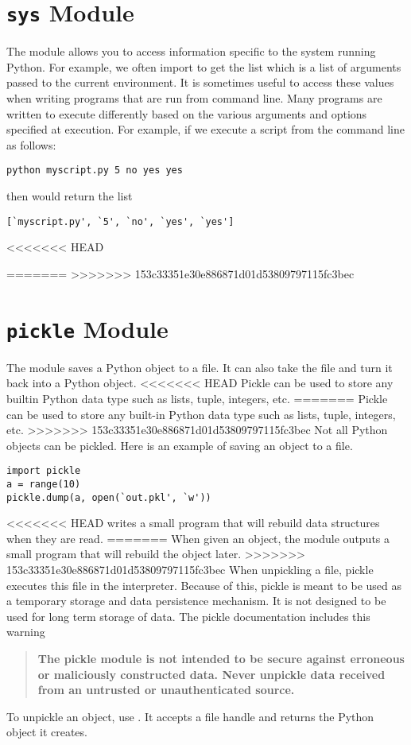 \section*{\texttt{sys} Module}
The  module allows you to access information specific to the system running Python.
For example, we often import  to get the list  which is a list of arguments passed to the current environment.
It is sometimes useful to access these values when writing programs that are run from command line.
Many programs are written to execute differently based on the various arguments and options specified at execution.
For example, if we execute a script from the command line as follows:
\begin{verbatim}
python myscript.py 5 no yes yes
\end{verbatim}
then  would return the list
\begin{verbatim}
[`myscript.py', `5', `no', `yes', `yes']
\end{verbatim}
<<<<<<< HEAD

=======
>>>>>>> 153c33351e30e886871d01d53809797115fc3bec

\section*{\texttt{pickle} Module}
The  module saves a Python object to a file.
It can also take the file and turn it back into a Python object.
<<<<<<< HEAD
Pickle can be used to store any builtin Python data type such as lists, tuple, integers, etc.
=======
Pickle can be used to store any built-in Python data type such as lists, tuple, integers, etc.
>>>>>>> 153c33351e30e886871d01d53809797115fc3bec
Not all Python objects can be pickled.
Here is an example of saving an object to a file.
\begin{lstlisting}
import pickle
a = range(10)
pickle.dump(a, open(`out.pkl', `w'))
\end{lstlisting}
<<<<<<< HEAD
 writes a small program that will rebuild data structures when they are read.
=======
When given an object, the  module outputs a small program that will rebuild the object later.
>>>>>>> 153c33351e30e886871d01d53809797115fc3bec
When unpickling a file, pickle executes this file in the interpreter.
Because of this, pickle is meant to be used as a temporary storage and data persistence mechanism.
It is not designed to be used for long term storage of data.
The pickle documentation includes this warning
\begin{quote}
\textbf{The pickle module is not intended to be secure against erroneous or maliciously constructed data.
Never unpickle data received from an untrusted or unauthenticated source.}
\end{quote}
To unpickle an object, use .
It accepts a file handle and returns the Python object it creates.

